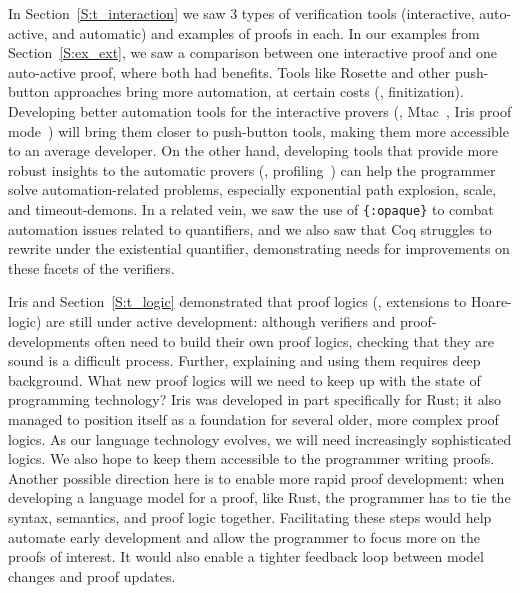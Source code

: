 In Section~\ref{S:t_interaction} we saw 3 types of verification tools
(interactive, auto-active, and automatic) and examples of proofs in each. In our
examples from Section~\ref{S:ex_ext}, we saw a comparison between one
interactive proof and one auto-active proof, where both had benefits. Tools like
Rosette and other push-button approaches bring more automation, at certain
costs (\eg, finitization). Developing better automation tools for the
interactive provers (\eg, Mtac~\cite{Kaiser_2018}, Iris proof
mode~\cite{Krebbers_2017b}) will bring them closer to push-button tools, making
them more accessible to an average developer. On the other hand, developing
tools that provide more robust insights to the automatic provers (\eg,
profiling~\cite{Bornholt_2018,Porncharoenwase_2020}) can help the programmer
solve automation-related problems, especially exponential path explosion, scale,
and timeout-demons. In a related vein, we saw the use of \texttt{\{:opaque\}} to
combat automation issues related to quantifiers, and we also saw that Coq
struggles to rewrite under the existential quantifier, demonstrating needs for
improvements on these facets of the verifiers.

Iris and Section~\ref{S:t_logic} demonstrated that proof logics (\eg, extensions
to Hoare-logic) are still under active development: although verifiers and
proof-developments often need to build their own proof logics, checking that
they are sound is a difficult process. Further, explaining and using them
requires deep background. What new proof logics will we need to keep up with the
state of programming technology? Iris was developed in part specifically for
Rust; it also managed to position itself as a foundation for several older, more
complex proof logics. As our language technology evolves, we will need
increasingly sophisticated logics. We also hope to keep them accessible to the
programmer writing proofs. Another possible direction here is to enable more
rapid proof development: when developing a language model for a proof, like
Rust, the programmer has to tie the syntax, semantics, and proof logic together.
Facilitating these steps would help automate early development and allow the
programmer to focus more on the proofs of interest. It would also enable a
tighter feedback loop between model changes and proof updates.

